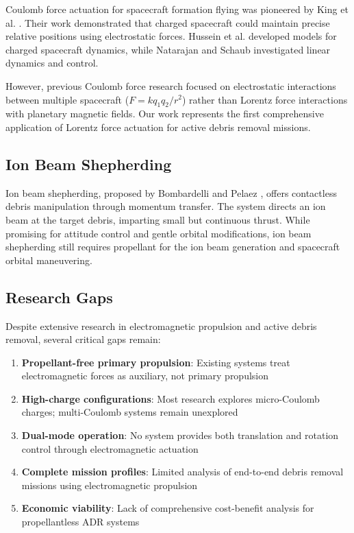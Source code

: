 \documentclass[12pt,a4paper]{article}
\begin{document}
Coulomb force actuation for spacecraft formation flying was pioneered by King et al. \cite{king2005spacecraft}. Their work demonstrated that charged spacecraft could maintain precise relative positions using electrostatic forces. Hussein et al. \cite{hussein2007modeling} developed models for charged spacecraft dynamics, while Natarajan and Schaub \cite{natarajan2006linear} investigated linear dynamics and control.

However, previous Coulomb force research focused on electrostatic interactions between multiple spacecraft ($F = k q_1 q_2 / r^2$) rather than Lorentz force interactions with planetary magnetic fields. Our work represents the first comprehensive application of Lorentz force actuation for active debris removal missions.

\subsection{Ion Beam Shepherding}

Ion beam shepherding, proposed by Bombardelli and Pelaez \cite{bombardelli2011ion}, offers contactless debris manipulation through momentum transfer. The system directs an ion beam at the target debris, imparting small but continuous thrust. While promising for attitude control and gentle orbital modifications, ion beam shepherding still requires propellant for the ion beam generation and spacecraft orbital maneuvering.

\subsection{Research Gaps}

Despite extensive research in electromagnetic propulsion and active debris removal, several critical gaps remain:

\begin{enumerate}
\item \textbf{Propellant-free primary propulsion}: Existing systems treat electromagnetic forces as auxiliary, not primary propulsion
\item \textbf{High-charge configurations}: Most research explores micro-Coulomb charges; multi-Coulomb systems remain unexplored
\item \textbf{Dual-mode operation}: No system provides both translation and rotation control through electromagnetic actuation
\item \textbf{Complete mission profiles}: Limited analysis of end-to-end debris removal missions using electromagnetic propulsion
\item \textbf{Economic viability}: Lack of comprehensive cost-benefit analysis for propellantless ADR systems
\end{enumerate}
\end{document}
